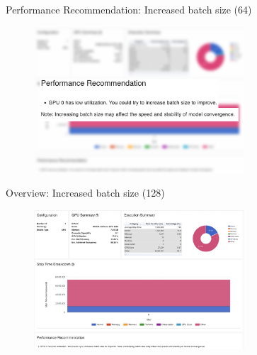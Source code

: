 \documentclass[compress,aspectratio=169]{beamer}
\begin{document}
\begin{frame}{Performance Recommendation: Increased batch size (64)}
    \vspace{-1em}
\begin{center}
    \begin{figure}
        \includegraphics[width=0.7\textwidth]{../../data/scap_gtx1080_profiler-torch_batch-size-64_14650758_zoom}
    \end{figure}
    \end{center}

\end{frame}


\begin{frame}{Overview: Increased batch size (128)}
    \vspace{-1em}
\begin{center}
    \begin{figure}
        \includegraphics[width=0.7\textwidth]{../../data/scap_gtx1080_profiler-torch_batch-size-128_14650759}
    \end{figure}
    \end{center}

\end{frame}
\end{document}
